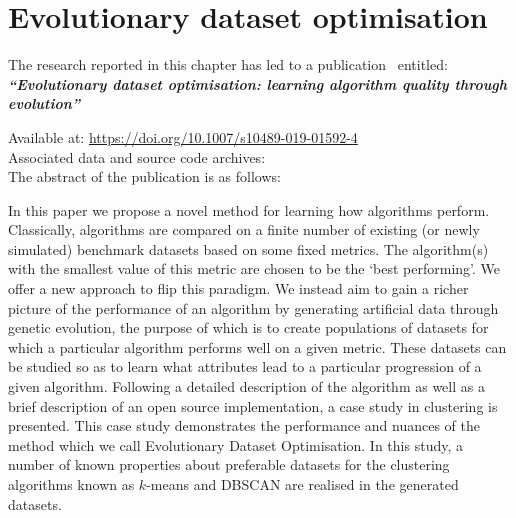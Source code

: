 \chapter{Evolutionary dataset optimisation}

\graphicspath{{chapters/edo/paper/img/}}
\renewcommand{\tikzpath}{chapters/edo/paper/tex/diagrams}
\renewcommand{\algpath}{chapters/edo/paper/tex/algorithms}

\begin{center}
    The research reported in this chapter has led to a
    publication~\cite{Wilde2020:edo} entitled:\\[1em]

    {%
        \bf\itshape{``Evolutionary dataset optimisation: learning algorithm
                    quality through evolution''}
    }

    Available at: \url{https://doi.org/10.1007/s10489-019-01592-4}\\

    Associated data and source code
    archives:~\cite{Wilde2019:edo:data,Wilde2019:edo:code}\\[1em]

    The abstract of the publication is as follows:\\[1em]
\end{center}

In this paper we propose a novel method for learning how algorithms perform.
Classically, algorithms are compared on a finite number of existing (or newly
simulated) benchmark datasets based on some fixed metrics. The algorithm(s) with
the smallest value of this metric are chosen to be the `best performing'. We
offer a new approach to flip this paradigm. We instead aim to gain a richer
picture of the performance of an algorithm by generating artificial data through
genetic evolution, the purpose of which is to create populations of datasets for
which a particular algorithm performs well on a given metric. These datasets can
be studied so as to learn what attributes lead to a particular progression of a
given algorithm.  Following a detailed description of the algorithm as well as a
brief description of an open source implementation, a case study in clustering
is presented. This case study demonstrates the performance and nuances of the
method which we call Evolutionary Dataset Optimisation. In this study, a number
of known properties about preferable datasets for the clustering algorithms
known as \(k\)-means and DBSCAN are realised in the generated datasets.

